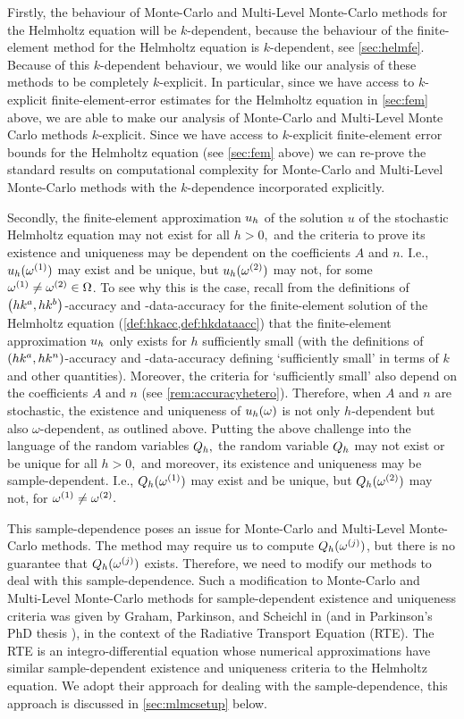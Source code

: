 Firstly, the behaviour of Monte-Carlo and Multi-Level Monte-Carlo methods for the Helmholtz equation will be $k$-dependent, because the behaviour of the finite-element method for the Helmholtz equation is $k$-dependent, see \cref{sec:helmfe}. Because of this $k$-dependent behaviour, we would like our analysis of these methods to be completely $k$-explicit. In particular, since we have access to $k$-explicit finite-element-error estimates for the Helmholtz equation in \cref{sec:fem} above, we are able to make our analysis of Monte-Carlo and Multi-Level Monte Carlo methods $k$-explicit.  Since we have access to $k$-explicit finite-element error bounds for the Helmholtz equation (see \cref{sec:fem} above) we can re-prove the standard results on computational complexity for Monte-Carlo and Multi-Level Monte-Carlo methods with the $k$-dependence incorporated explicitly.

Secondly, the finite-element approximation $u_{h}$ of the solution $u$ of the stochastic Helmholtz equation may not exist for all $h > 0,$ and the criteria to prove its existence and uniqueness may be dependent on the coefficients $A$ and $n.$ I.e., $u_{h}(\omega^{(1)})$ may exist and be unique, but $u_{h}(\omega^{(2)})$ may not, for some $\omega^{(1)}\neq\omega^{(2)}\in\Omega$. To see why this is the case, recall from the definitions of $\hk{a}{b}$-accuracy and -data-accuracy for the finite-element solution of the Helmholtz equation (\cref{def:hkacc,def:hkdataacc}) that the finite-element approximation $u_{h}$ only exists for $h$ sufficiently small (with the definitions of $\hk{a}{n}$-accuracy and -data-accuracy defining `sufficiently small' in terms of $k$ and other quantities). Moreover, the criteria for `sufficiently small' also depend on the coefficients $A$ and $n$ (see \cref{rem:accuracyhetero}). Therefore, when $A$ and $n$ are stochastic, the existence and uniqueness of $u_{h}(\omega)$ is not only $h$-dependent but also $\omega$-dependent, as outlined above. Putting the above challenge into the language of the random variables $Q_{h},$ the random variable $Q_{h}$ may not exist or be unique for all $h>0,$ and moreover, its existence and uniqueness may be sample-dependent. I.e., $Q_{h}(\omega^{(1)})$ may exist and be unique, but $Q_{h}(\omega^{(2)})$ may not, for $\omega^{(1)}\neq\omega^{(2)}.$

This sample-dependence poses an issue for Monte-Carlo and Multi-Level Monte-Carlo methods. The method may require us to compute $Q_{h}(\omega^{(j)})$, but there is no guarantee that $Q_{h}(\omega^{(j)})$ exists. Therefore, we need to modify our methods to deal with this sample-dependence. Such a modification to Monte-Carlo and Multi-Level Monte-Carlo methods for sample-dependent existence and uniqueness criteria was given by Graham, Parkinson, and Scheichl in \cite{GrPaSc:19} (and in Parkinson's PhD thesis \cite{Pa:18}), in the context of the Radiative Transport Equation (RTE). The RTE is an integro-differential equation whose numerical approximations have similar sample-dependent existence and uniqueness criteria to the Helmholtz equation. We adopt their approach for dealing with the sample-dependence, this approach is discussed in \cref{sec:mlmcsetup} below.

